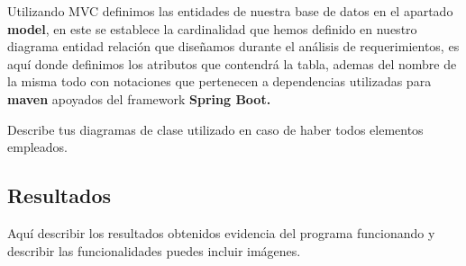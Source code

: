 	Utilizando MVC definimos las entidades de nuestra base de datos en el apartado \textbf{model}, en este se establece la cardinalidad que hemos definido en nuestro diagrama entidad relación que diseñamos durante el análisis de requerimientos, es aquí donde definimos los atributos que contendrá la tabla, ademas del nombre de la misma todo con notaciones que pertenecen a dependencias utilizadas para \textbf{maven} apoyados del framework \textbf{Spring Boot.}

	
	
	
	
	
	Describe tus diagramas de clase utilizado en caso de  haber todos elementos empleados.
	
\subsection{Resultados}
Aquí describir los resultados obtenidos evidencia del programa funcionando y describir las funcionalidades puedes incluir imágenes.
